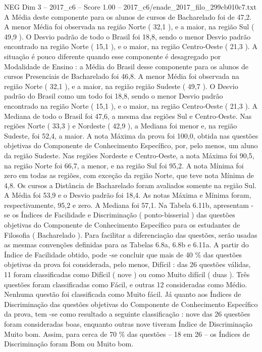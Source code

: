 \begin{textsample}{NEG Dim 3 – 2017\_c6 – Score 1.00 – 2017\_c6/enade\_2017\_filo\_299cb010c7.txt}
A Média deste componente para os alunos de cursos de Bacharelado foi de 47,2.
A menor Média foi observada na região Norte ( 32,1 ), e a maior, na região Sul ( 49,9 ).
O Desvio padrão de todo o Brasil foi 18,8, sendo o menor Desvio padrão encontrado na região Norte ( 15,1 ), e o maior, na região Centro-Oeste ( 21,3 ).
A situação é pouco diferente quando esse componente é desagregado por Modalidade de Ensino : a Média do Brasil desse componente para os alunos de cursos Presenciais de Bacharelado foi 46,8.
A menor Média foi observada na região Norte ( 32,1 ), e a maior, na região região Sudeste ( 49,7 ).
O Desvio padrão do Brasil como um todo foi 18,8, sendo o menor Desvio padrão encontrado na região Norte ( 15,1 ), e o maior, na região Centro-Oeste ( 21,3 ).
A Mediana de todo o Brasil foi 47,6, a mesma das regiões Sul e Centro-Oeste.
Nas regiões Norte ( 33,3 ) e Nordeste ( 42,9 ), a Mediana foi menor e, na região Sudeste, foi 52,4, a maior.
A nota Máxima da prova foi 100,0, obtida nas questões objetivas do Componente de Conhecimento Específico, por, pelo menos, um aluno da região Sudeste.
Nas regiões Nordeste e Centro-Oeste, a nota Máxima foi 90,5, na região Norte foi 66,7, a menor, e na região Sul foi 95,2.
A nota Mínima foi zero em todas as regiões, com exceção da região Norte, que teve nota Mínima de 4,8.
Os cursos a Distância de Bacharelado foram avaliados somente na região Sul.
A Média foi 53,9 e o Desvio padrão foi 18,4.
As notas Máxima e Mínima foram, respectivamente, 95,2 e zero.
A Mediana foi 57,1.
Na Tabela 6.11b, apresentam -se os Índices de Facilidade e Discriminação ( ponto-bisserial ) das questões objetivas do Componente de Conhecimento Específico para os estudantes de Filosofia ( Bacharelado ).
Para facilitar a diferenciação das questões, serão usadas as mesmas convenções definidas para as Tabelas 6.8a, 6.8b e 6.11a.
A partir do Índice de Facilidade obtido, pode -se concluir que mais de 40 \% das questões objetivas da prova foi considerada, pelo menos, Difícil : das 26 questões válidas, 11 foram classificadas como Difícil ( nove ) ou como Muito difícil ( duas ).
Três questões foram classificadas como Fácil, e outras 12 consideradas como Médio.
Nenhuma questão foi classificada como Muito fácil.
Já quanto aos Índices de Discriminação das questões objetivas do Componente de Conhecimento Específico da prova, tem -se como resultado a seguinte classificação : nove das 26 questões foram consideradas boas, enquanto outras nove tiveram Índice de Discriminação Muito bom.
Assim, para cerca de 70 \% das questões – 18 em 26 – os Índices de Discriminação foram Bom ou Muito bom.

\end{textsample}
